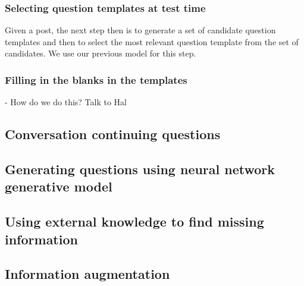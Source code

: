 \documentclass[11pt]{article}
\begin{document}
\subsubsection{Selecting question templates at test time}

Given a post, the next step then is to generate a set of candidate question templates and then to select the most relevant question template from the set of candidates. We use our previous model for this step.

\subsubsection{Filling in the blanks in the templates}

- How do we do this? Talk to Hal

\subsection{Conversation continuing questions}

\subsection{Generating questions using neural network generative model}

\subsection{Using external knowledge to find missing information}

\subsection{Information augmentation}
\end{document}
